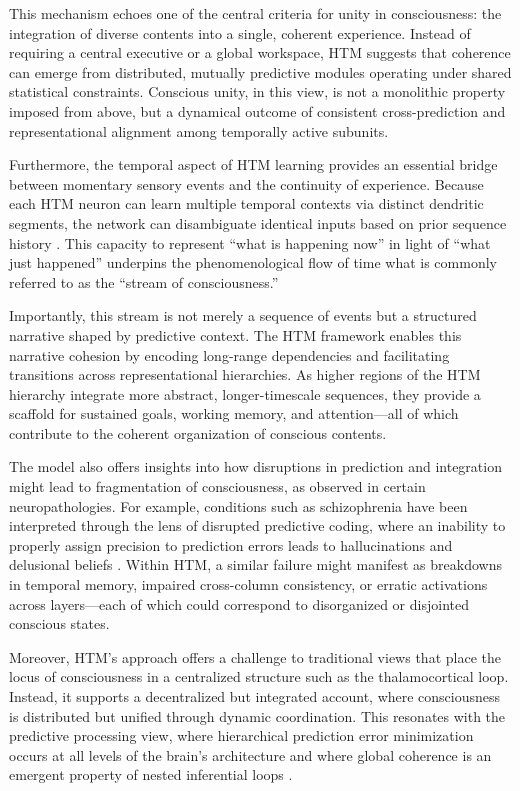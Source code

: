 \documentclass{article}
\begin{document}
This mechanism echoes one of the central criteria for unity in consciousness: the integration of diverse contents into a single, coherent experience. Instead of requiring a central executive or a global workspace, HTM suggests that coherence can emerge from distributed, mutually predictive modules operating under shared statistical constraints. Conscious unity, in this view, is not a monolithic property imposed from above, but a dynamical outcome of consistent cross-prediction and representational alignment among temporally active subunits.

Furthermore, the temporal aspect of HTM learning provides an essential bridge between momentary sensory events and the continuity of experience. Because each HTM neuron can learn multiple temporal contexts via distinct dendritic segments, the network can disambiguate identical inputs based on prior sequence history \parencite{hawkins2016why}. This capacity to represent “what is happening now” in light of “what just happened” underpins the phenomenological flow of time what is commonly referred to as the “stream of consciousness.”

Importantly, this stream is not merely a sequence of events but a structured narrative shaped by predictive context. The HTM framework enables this narrative cohesion by encoding long-range dependencies and facilitating transitions across representational hierarchies. As higher regions of the HTM hierarchy integrate more abstract, longer-timescale sequences, they provide a scaffold for sustained goals, working memory, and attention—all of which contribute to the coherent organization of conscious contents.

The model also offers insights into how disruptions in prediction and integration might lead to fragmentation of consciousness, as observed in certain neuropathologies. For example, conditions such as schizophrenia have been interpreted through the lens of disrupted predictive coding, where an inability to properly assign precision to prediction errors leads to hallucinations and delusional beliefs \parencite{clark2016surfing}. Within HTM, a similar failure might manifest as breakdowns in temporal memory, impaired cross-column consistency, or erratic activations across layers—each of which could correspond to disorganized or disjointed conscious states.

Moreover, HTM’s approach offers a challenge to traditional views that place the locus of consciousness in a centralized structure such as the thalamocortical loop. Instead, it supports a decentralized but integrated account, where consciousness is distributed but unified through dynamic coordination. This resonates with the predictive processing view, where hierarchical prediction error minimization occurs at all levels of the brain's architecture and where global coherence is an emergent property of nested inferential loops \parencite{friston2010free}.
\end{document}

